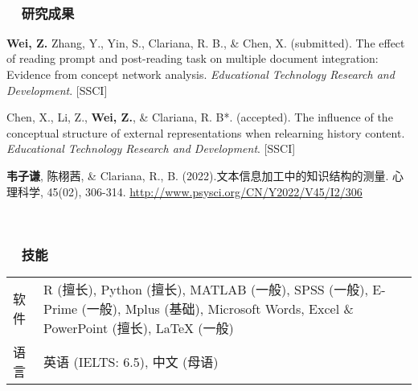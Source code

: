 \documentclass[a4paper, 12pt]{ctexart}
\begin{document}
\  \par


\subsubsection*{ \ \ 研究成果}

\begin{description}
    
    \item \textbf{Wei, Z.} Zhang, Y., Yin, S., Clariana, R. B., \& Chen, X. (submitted). The effect of reading prompt and post-reading task on multiple document integration: Evidence from concept network analysis. \textit{Educational Technology Research and Development}. [SSCI]

    \item Chen, X., Li, Z., \textbf{Wei, Z.}, \& Clariana, R. B*. (accepted). The influence of the conceptual structure of external representations when relearning history content. \textit{Educational Technology Research and Development}. [SSCI]

    \item \textbf{韦子谦}, 陈栩茜, \& Clariana, R., B. (2022).文本信息加工中的知识结构的测量. 心理科学, 45(02), 306-314. \href{http://www.psysci.org/CN/Y2022/V45/I2/306}{http://www.psysci.org/CN/Y2022/V45/I2/306}

    
    \end{description}

\  \par


\subsubsection*{ \ \ 技能}

\begin{tabularx}{\textwidth}{p{2cm} X}
    
    软件 & R (擅长), Python (擅长), MATLAB (一般), SPSS (一般), E-Prime (一般), Mplus (基础), Microsoft Words, Excel \& PowerPoint (擅长), LaTeX (一般) \\
    
    语言 &英语 (IELTS: 6.5), 中文 (母语) \\
    
    \end{tabularx}
\end{document}
